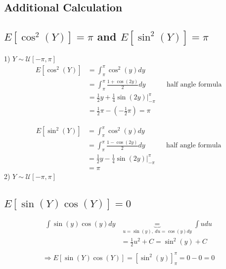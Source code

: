 \documentclass{article}
\begin{document}
\begin{appendices}

\section{Additional Calculation}

\subsection{$E[\cos^2(Y)] = \pi$ and $E[\sin^2(Y)] = \pi$}
\label{appendix:cos2y}

1) $ Y \sim \mathcal{U}[-\pi, \pi] $\\
\begin{align*}
E[\cos^2(Y)] &= \int_{\pi}^\pi \cos^2(y) dy\\
&= \int_{\pi}^\pi \frac{1 + \cos(2y)}{2} dy &&\text{half angle formula}\\
&= \frac{1}{2} y + \frac{1}{4} \sin(2y) \Big|_{-\pi}^\pi\\
&= \frac{1}{2} \pi - (- \frac{1}{2} \pi) = \pi
\end{align*}

\begin{align*}
E[\sin^2(Y)] &= \int_{\pi}^\pi \cos^2(y) dy\\
&= \int_{\pi}^\pi \frac{1 - \cos(2y)}{2} dy &&\text{half angle formula}\\
&= \frac{1}{2} y - \frac{1}{4} \sin(2y) \Big|_{-\pi}^\pi\\
&= \pi
\end{align*}
2) $ Y \sim \mathcal{U}[-\pi, \pi] $

\subsection{$E[\sin(Y)\cos(Y)] = 0$} \label{appendix:sinycosy}
\begin{align*}
\int \sin(y)\cos(y)dy& \underbrace{=}_{u = \sin(y), \ du = \cos(y)dy} \int u du \\
&= \frac 1 2 u^2 + C = \sin^2(y) + C \\
\end{align*}
\begin{align*}
\Rightarrow E[\sin(Y)\cos(Y)] = [\sin^2(y)]^{\pi}_{\pi} = 0 - 0 = 0
\end{align*}

\end{appendices}



\end{document}
